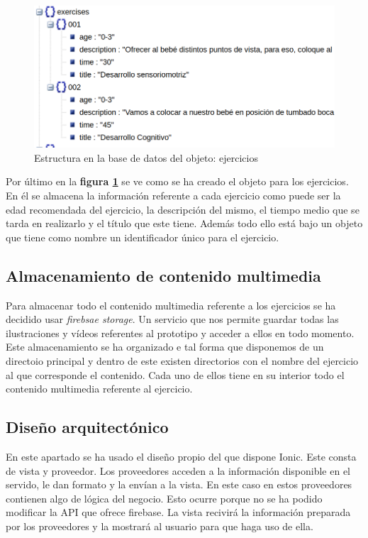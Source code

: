 \medskip
\begin{figure}
    \includegraphics[width=\linewidth]{./images/database/exercises-database.png}
    \caption{Estructura en la base de datos del objeto: ejercicios}
    \label{ejercicios}
\end{figure}

Por último en la \textbf{figura \ref{ejercicios}} se ve
como se ha creado el objeto para los ejercicios. En él se almacena la información
referente a cada ejercicio como puede ser la edad recomendada del ejercicio,
la descripción del mismo, el tiempo medio que se tarda en realizarlo y el
título que este tiene. Además todo ello está bajo un objeto que tiene como
nombre un identificador único para el ejercicio.

\subsection{Almacenamiento de contenido multimedia}

Para almacenar todo el contenido multimedia referente a los ejercicios se ha
decidido usar \textit{firebsae storage}. Un servicio que nos permite guardar
todas las ilustraciones y vídeos referentes al prototipo y acceder a ellos en
todo momento. Este almacenamiento se ha organizado e tal forma que disponemos
de un directoio principal y dentro de este existen directorios con el nombre
del ejercicio al que corresponde el contenido. Cada uno de ellos tiene en su
interior todo el contenido multimedia referente al ejercicio.

\subsection{Diseño arquitectónico}

En este apartado se ha usado el diseño propio del que dispone Ionic. Este consta
de vista y proveedor. Los proveedores acceden a la información disponible en el
servido, le dan formato y la envían a la vista. En este caso en estos proveedores
contienen algo de lógica del negocio. Esto ocurre porque no se ha podido modificar
la API que ofrece firebase. La vista recivirá la información preparada por los
proveedores y la mostrará al usuario para que haga uso de ella.